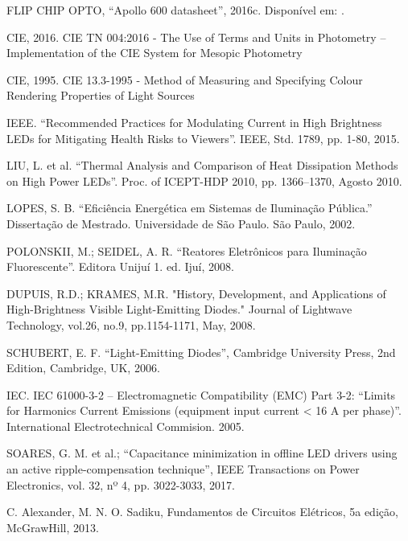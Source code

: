 \documentclass[
        12pt,
        openany, %
        oneside, %
        a4paper,			
        english,			
        brazil
        ]{abntbibufjf}
\begin{document}


\postextual

\begin{thebibliography}{99}

 FLIP CHIP OPTO, “Apollo 600 datasheet”, 2016c. Disponível em: \cite{github}.

 CIE, 2016. CIE TN 004:2016 - The Use of Terms and Units in Photometry – Implementation of the CIE System for Mesopic Photometry

 CIE, 1995. CIE 13.3-1995 - Method of Measuring and Specifying Colour Rendering Properties of Light Sources

 IEEE. “Recommended Practices for Modulating Current in High Brightness LEDs for Mitigating Health Risks to Viewers”. IEEE, Std. 1789, pp. 1-80, 2015.

 LIU, L. et al. “Thermal Analysis and Comparison of Heat Dissipation Methods on High Power LEDs”. Proc. of ICEPT-HDP 2010, pp. 1366–1370, Agosto 2010.

 LOPES, S. B. “Eficiência Energética em Sistemas de Iluminação Pública.” Dissertação de Mestrado. Universidade de São Paulo. São Paulo, 2002.

 POLONSKII, M.; SEIDEL, A. R. “Reatores Eletrônicos para Iluminação Fluorescente”. Editora Unijuí 1. ed. Ijuí, 2008.

 DUPUIS, R.D.; KRAMES, M.R. "History, Development, and Applications of High-Brightness Visible Light-Emitting Diodes." Journal of Lightwave Technology, vol.26, no.9, pp.1154-1171, May, 2008.

 SCHUBERT, E. F. “Light-Emitting Diodes”, Cambridge University Press, 2nd Edition, Cambridge, UK, 2006.

 IEC. IEC 61000-3-2 – Electromagnetic Compatibility (EMC) Part 3-2: “Limits for Harmonics Current Emissions (equipment input current < 16 A per phase)”. International Electrotechnical Commision. 2005.

 SOARES, G. M. et al.; “Capacitance minimization in offline LED drivers using an active ripple-compensation technique”, IEEE Transactions on Power Electronics, vol. 32, nº 4, pp. 3022-3033, 2017.

 C. Alexander, M. N. O. Sadiku, Fundamentos de Circuitos Elétricos, 5a edição, McGrawHill, 2013.


\end{thebibliography}
\end{document}
